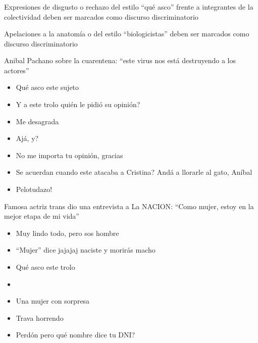 \subsubsection{}

Expresiones de disgusto o rechazo del estilo ``qué asco'' frente a integrantes de la colectividad deben ser marcados como discurso discriminatorio


Apelaciones a la anatomía o del estilo ``biologicistas'' deben ser marcados como discurso discriminatorio




\begin{displayquote}
     Anibal Pachano sobre la cuarentena: ``este virus nos está destruyendo a los actores''



    \begin{itemize}
        \item Qué asco este sujeto
        \item Y a este trolo quién le pidió su opinión?
        \item Me desagrada
    \end{itemize}


    \begin{itemize}
        \item Ajá, y?
        \item No me importa tu opinión, gracias
        \item Se acuerdan cuando este atacaba a Cristina? Andá a llorarle al gato, Aníbal
        \item Pelotudazo!
    \end{itemize}

    Famosa actriz trans dio una entrevista a La NACION: ``Como mujer, estoy en la mejor etapa de mi vida''

    \begin{itemize}
        \item Muy lindo todo, pero sos hombre
        \item ``Mujer'' dice jajajaj naciste y morirás macho
        \item Qué asco este trolo
        \item {}
        \item Una mujer con sorpresa
        \item Trava horrendo
        \item Perdón pero qué nombre dice tu DNI?
    \end{itemize}


\end{displayquote}
